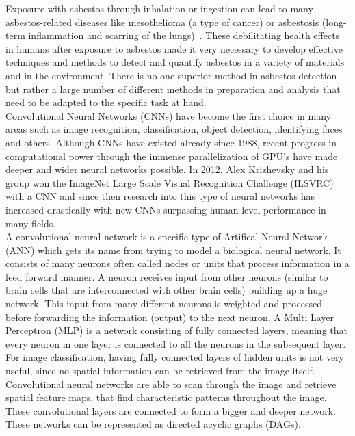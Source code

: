 Exposure with asbestos through inhalation or ingestion can lead to many asbestos-related diseases like mesothelioma (a type of cancer) or asbestosis (long-term inflammation and scarring of the lungs)~\cite{asbestosMaacenter, MesotheliomaWiki, asbestosisWiki}. These debilitating health effects in humans after exposure to asbestos made it very necessary to develop effective techniques and methods to detect and quantify asbestos in a variety of materials and in the environment. There is no one superior method in asbestos detection but rather a large number of different methods in preparation and analysis that need to be adapted to the specific task at hand. \\

Convolutional Neural Networks (CNNs) have become the first choice in many areas such as image recognition, classification, object detection, identifying faces and others. Although CNNs have existed already since 1988, recent progress in computational power through the immense parallelization of GPU's have made deeper and wider neural networks possible. In 2012, Alex Krizhevsky and his group won the ImageNet Large Scale Visual Recognition Challenge (ILSVRC)~\cite{krizhevsky2012imagenet, imagenet} with a CNN and since then research into this type of neural networks has increased drastically with new CNNs surpassing human-level performance in many fields. \\

A convolutional neural network is a specific type of Artifical Neural Network (ANN) which gets its name from trying to model a biological neural network. It consists of many neurons often called nodes or units that process information in a feed forward manner. A neuron receives input from other neurons (similar to brain cells that are interconnected with other brain cells) building up a huge network. This input from many different neurons is weighted and processed before forwarding the information (output) to the next neuron. A Multi Layer Perceptron (MLP) is a network consisting of fully connected layers, meaning that every neuron in one layer is connected to all the neurons in the subsequent layer. \\

For image classification, having fully connected layers of hidden units is not very useful, since no spatial information can be retrieved from the image itself. Convolutional neural networks are able to scan through the image and retrieve spatial feature maps, that find characteristic patterns throughout the image. These convolutional layers are connected to form a bigger and deeper network. These networks can be represented as directed acyclic graphs (DAGs). \\

